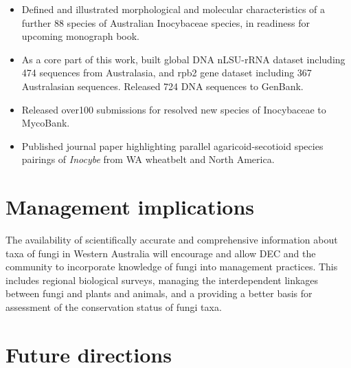 \documentclass[version=last, paper=a4, DIV=18, usenames, dvipsnames]{scrartcl}
\begin{document}
\begin{itemize}

  \item Defined and illustrated morphological and molecular characteristics of a further 88 species of Australian Inocybaceae species, in readiness for upcoming monograph book.

  \item As a core part of this work, built global DNA nLSU-rRNA dataset including 474 sequences from Australasia, and rpb2 gene dataset including 367 Australasian sequences. Released 724 DNA sequences to GenBank.

  \item Released over100 submissions for resolved new species of Inocybaceae to MycoBank.

  \item Published journal paper highlighting parallel agaricoid-secotioid species pairings of \emph{Inocybe} from WA wheatbelt and North America.

\end{itemize}






\section{Management implications}



The availability of scientifically accurate and comprehensive information about taxa of fungi in Western Australia will encourage and allow DEC and the community to incorporate knowledge of fungi into management practices. This includes regional biological surveys, managing the interdependent linkages between fungi and plants and animals, and a providing a better basis for assessment of the conservation status of fungi taxa.






\section{Future directions}
\end{document}
